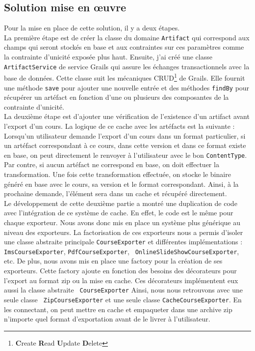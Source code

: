 \subsection{Solution mise en \oe uvre}
Pour la mise en place de cette solution, il y a deux étapes.\\

La première étape est de créer la classe du domaine {\tt Artifact} qui
correspond aux champs qui seront stockés en base et aux contraintes sur ces
paramètres comme la contrainte d'unicité exposée plus haut. Ensuite, j'ai créé
une classe {\tt ArtifactService} de service Grails qui assure les échanges
transactionnels avec la base de données. Cette classe suit les mécaniques
CRUD\footnote{{\bf C}reate {\bf R}ead {\bf U}pdate {\bf D}elete} de
Grails. Elle fournit une méthode {\tt save} pour ajouter une nouvelle entrée et
des méthodes {\tt findBy} pour récupérer un artéfact en fonction d'une ou
plusieurs des composantes de la contrainte d'unicité.\\

La deuxième étape est d'ajouter une vérification de l'existence d'un artifact
avant l'export d'un cours. La logique de ce cache avec les artéfacts est la
suivante : Lorsqu'un utilisateur demande l'export d'un cours dans un format
particulier, si un artéfact correspondant à ce cours, dans cette version et dans
ce format existe en base, on peut directement le renvoyer à l'utilisateur avec
le bon {\tt ContentType}. Par contre, si aucun artéfact ne correspond en base,
on doit effectuer la transformation. Une fois cette transformation effectuée, on
stocke le binaire généré en base avec le cours, sa version et le format
correspondant. Ainsi, à la prochaine demande, l'élément sera dans un \og cache
\fg{} et récupéré directement.\\

Le développement de cette deuxième partie a montré une duplication de code avec
l'intégration de ce système de cache. En effet, le code est le même pour chaque
exporteur. Nous avons donc mis en place un système plus générique au niveau des
exporteurs. La factorisation de ces exporteurs nous a permis d'isoler une classe
abstraite principale {\tt CourseExporter} et différentes implémentations : {\tt
ImsCourseExporter}, {\tt PdfCourseExporter}, {\tt
OnlineSlideShowCourseExporter}, etc. De plus, nous avons mis en place une \og
factory \fg{} pour la création de ses exporteurs. Cette factory ajoute en
fonction des besoins des décorateurs pour l'export au format zip ou la mise en
cache. Ces décorateurs implémentent eux aussi la classe abstraite {\tt
CourseExporter} Ainsi, nous nous retrouvons avec une seule classe {\tt
ZipCourseExporter} et une seule classe {\tt CacheCourseExporter}. En les
connectant, on peut mettre en cache et empaqueter dans une archive zip
n'importe quel format d'exportation avant de le livrer à l'utilisateur.


